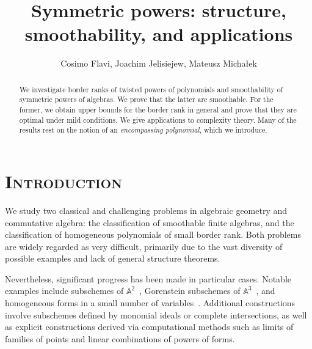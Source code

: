 \documentclass[a4paper,11pt,reqno]{amsart}
\title{Symmetric powers: structure, smoothability, and applications}
\author{Cosimo Flavi, Joachim Jelisiejew, Mateusz Micha{\l}ek}
\newcommand{\oldtext}[1]{\textcolor{darkelectricblue}{#1}}
\newcommand{\cfchange}[1]{\textcolor{blue}{#1}}
\newcommand{\oldinvtext}[1]{}
\numberwithin{equation}{section}
\theoremstyle{definition}
\theoremstyle{plain}
\theoremstyle{remark}
\begin{document}
\renewcommand{\abstractname}{\normalfont \scshape\fontfamily{ptm}\selectfont{Abstract}}
\begin{abstract}
    We investigate border ranks of twisted powers of polynomials and
    smoothability of symmetric powers of algebras. We prove that the latter
are smoothable. For the former, we obtain upper bounds for the border rank in
general and prove that they are optimal under mild conditions. We give
applications to complexity theory. {Many of the results rest on the notion of an \emph{encompassing polynomial}, which we introduce.}
\end{abstract}
\maketitle

\thispagestyle{empty}


\section{\normalfont \scshape{}\selectfont Introduction}
    \oldinvtext{We consider two classical problems: finding
    smoothable finite algebras and finding
    homogeneous polynomials of small border rank.
    \oldtext{Both problems are understood to be next-to-impossible in general and} \cfchange{Both problems are generally considered to be almost impossible, and}
    positive results are \oldtext{very} scarce except for specific cases, such as
    subschemes of $\mathbb{A}^2$~\cite{fogarty}, Gorenstein subschemes of
    $\mathbb{A}^3$~\cite{kleppe_roig_codimensionthreeGorenstein}, forms in
    small number of variables~\cite{Landsberg__tensors}, subschemes defined by monomial ideals or complete intersections.
    Outside this realm, the main general tool to obtain either object is using tensor powers:}

{We study two classical and challenging problems in algebraic geometry and commutative algebra: the classification of smoothable finite algebras, and the classification of homogeneous polynomials of small border rank. Both problems are widely regarded as very difficult, primarily due to the vast diversity of possible examples and lack of general structure theorems.}

{Nevertheless, significant progress has been made in particular cases. Notable examples include subschemes of $\mathbb{A}^2$~\cite{fogarty}, Gorenstein subschemes of $\mathbb{A}^3$~\cite{kleppe_roig_codimensionthreeGorenstein}, and homogeneous forms in a small number of variables~\cite{Landsberg__tensors}. Additional constructions involve subschemes defined by monomial ideals or complete intersections, as well as explicit constructions derived via computational methods such as limits of families of points and linear combinations of powers of forms.}
\end{document}
